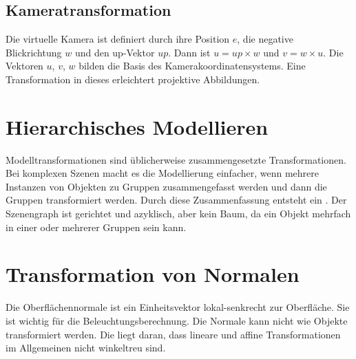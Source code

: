 \subsection{Kameratransformation}
Die virtuelle Kamera ist definiert durch ihre Position $e$, die negative Blickrichtung $w$ und den up-Vektor $up$.
Dann ist $u = up \times w$ und $v = w \times u$.
Die Vektoren $u$, $v$, $w$ bilden die Basis des Kamerakoordinatensystems.
Eine Transformation in dieses erleichtert projektive Abbildungen.

\section{Hierarchisches Modellieren}
Modelltransformationen sind üblicherweise zusammengesetzte Transformationen.
Bei komplexen Szenen macht es die Modellierung einfacher, wenn mehrere Instanzen von Objekten zu Gruppen zusammengefasst werden und dann die Gruppen transformiert werden.
Durch diese Zusammenfassung entsteht ein .
Der Szenengraph ist gerichtet und azyklisch, aber kein Baum, da ein Objekt mehrfach in einer oder mehrerer Gruppen sein kann.

\section{Transformation von Normalen}
Die Oberflächennormale ist ein Einheitsvektor lokal-senkrecht zur Oberfläche.
Sie ist wichtig für die Beleuchtungsberechnung.
Die Normale kann nicht wie Objekte transformiert werden.
Die liegt daran, dass lineare und affine Transformationen im Allgemeinen nicht winkeltreu sind.

